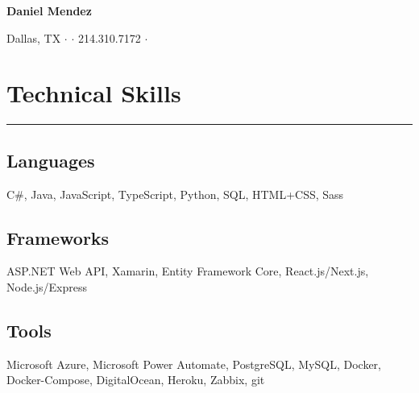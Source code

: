 \documentclass[10pt]{article}
\begin{document}
\begin{center}
    \large{\huge\textbf{Daniel Mendez}}
\end{center}
\begin{center}
    Dallas, TX {\onehalfspacing} $\cdot$ {\onehalfspacing} \textit{\href{https://mail.google.com/mail/?view=cm&fs=1&to=dmtx97@gmail.com}{\underline{}}} {\onehalfspacing} $\cdot$ {\onehalfspacing} 214.310.7172 {\onehalfspacing} $\cdot$ {\onehalfspacing} \textit{\href{https://danielmendez.site}{\underline{}}}
\end{center}

\section*{Technical Skills}
\vspace{-.6cm}
\par\noindent\textcolor{black}{\rule{\textwidth}{.5pt}} 
\vspace{-.8cm}
\begin{paracol}{2}
    \begin{leftcolumn} 
        \sloppy
        \subsection*{Languages}
        \begin{flushleft}            
            C\#, Java, JavaScript, TypeScript, Python, SQL, HTML+CSS, Sass
        \end{flushleft}
    \end{leftcolumn}

    \begin{rightcolumn} 
        \subsection*{Frameworks}
        \begin{flushleft}            
            ASP.NET Web API, Xamarin, Entity Framework Core, React.js/Next.js, Node.js/Express
        \end{flushleft}
    \end{rightcolumn}
\end{paracol}
\vspace{-.6cm}
\subsection*{Tools}
\begin{flushleft}
    Microsoft Azure, Microsoft Power Automate, PostgreSQL, MySQL, Docker, Docker-Compose, DigitalOcean, Heroku, Zabbix, git
\end{flushleft}
\end{document}
